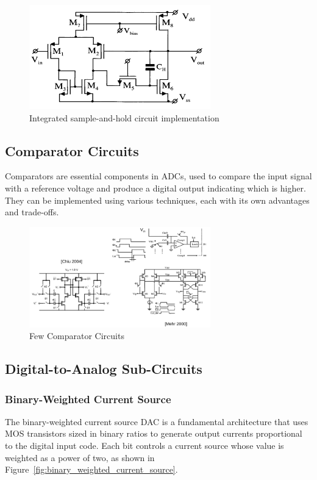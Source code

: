 \begin{figure}[h]
    \centering
    \includegraphics[width=0.7\textwidth]{figs/practical_sh_config.png}
    \caption{Integrated sample-and-hold circuit implementation}
    \label{fig:practical_sh_circuit}
\end{figure}

\subsection{Comparator Circuits}
Comparators are essential components in ADCs, used to compare the input signal with a reference voltage and produce a digital output indicating which is higher. They can be implemented using various techniques, each with its own advantages and trade-offs.
\begin{figure}[H]
    \centering
    \includegraphics[width=0.7\textwidth]{figs/compartator_circuits.png}
    \caption{Few Comparator Circuits}
    \label{fig:comparator_circuit}
\end{figure}
\subsection{Digital-to-Analog Sub-Circuits}
\subsubsection{Binary-Weighted Current Source}
The binary-weighted current source DAC is a fundamental architecture that uses MOS transistors sized in binary ratios to generate output currents proportional to the digital input code. Each bit controls a current source whose value is weighted as a power of two, as shown in Figure~\ref{fig:binary_weighted_current_source}.

